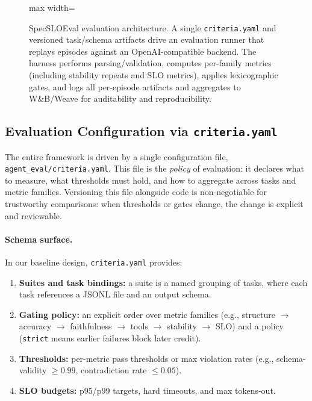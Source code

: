 \documentclass[11pt]{article}
\begin{document}
\begin{figure}[t]
\begin{adjustbox}{max width=\linewidth}
\end{adjustbox}
\caption{SpecSLOEval evaluation architecture.
A single \texttt{criteria.yaml} and versioned task/schema artifacts drive an evaluation runner that replays episodes against an OpenAI-compatible backend.
The harness performs parsing/validation, computes per-family metrics (including stability repeats and SLO metrics), applies lexicographic gates, and logs all per-episode artifacts and aggregates to W\&B/Weave for auditability and reproducibility.}
\label{fig:eval-arch}
\end{figure}

\subsection{Evaluation Configuration via \texttt{criteria.yaml}}
\label{sec:criteria-yaml}

The entire framework is driven by a single configuration file, \texttt{agent\_eval/criteria.yaml}.
This file is the \emph{policy} of evaluation: it declares what to measure, what thresholds must hold, and how to aggregate across tasks and metric families.
Versioning this file alongside code is non-negotiable for trustworthy comparisons: when thresholds or gates change, the change is explicit and reviewable.

\paragraph{Schema surface.}
In our baseline design, \texttt{criteria.yaml} provides:

\begin{enumerate}[leftmargin=12pt]
    \item \textbf{Suites and task bindings:} a suite is a named grouping of tasks, where each task references a JSONL file and an output schema.
    \item \textbf{Gating policy:} an explicit order over metric families (e.g., structure $\rightarrow$ accuracy $\rightarrow$ faithfulness $\rightarrow$ tools $\rightarrow$ stability $\rightarrow$ SLO) and a policy (\texttt{strict} means earlier failures block later credit).
    \item \textbf{Thresholds:} per-metric pass thresholds or max violation rates (e.g., schema-validity $\ge 0.99$, contradiction rate $\le 0.05$).
    \item \textbf{SLO budgets:} p95/p99 targets, hard timeouts, and max tokens-out.
\end{enumerate}
\end{document}
